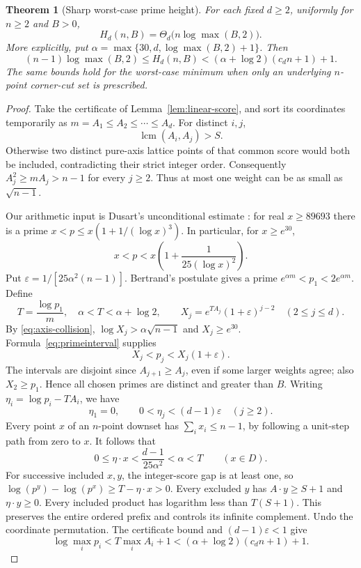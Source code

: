 \documentclass[11pt,a4paper]{article}
\newtheorem{theorem}{Theorem}
\theoremstyle{remark}
\begin{document}
\begin{theorem}[Sharp worst-case prime height]\label{thm:height}
For each fixed \(d\geq2\), uniformly for \(n\geq2\) and \(B>0\),
\[
 H_d(n,B)=\Theta_d\bigl(n\log\max(B,2)\bigr).
\]
More explicitly, put \(\alpha=\max\{30,d,\log\max(B,2)+1\}\).
Then
\[
 (n-1)\log\max(B,2)\leq H_d(n,B)
 <(\alpha+\log2)(c_dn+1)+1.                 \tag{16}\label{eq:primeheight}
\]
The same bounds hold for the worst-case minimum when only an underlying
\(n\)-point corner-cut set is prescribed.
\end{theorem}
\begin{proof}
Take the certificate of Lemma~\ref{lem:linear-score}, and sort its
coordinates temporarily as \(m=A_1\leq A_2\leq\cdots\leq A_d\).
For distinct \(i,j\),
\[
 \operatorname{lcm}(A_i,A_j)>S.              \tag{17}\label{eq:axis-collision}
\]
Otherwise two distinct pure-axis lattice points of that common score
would both be included, contradicting their strict integer order.
Consequently \(A_j^2\geq mA_j>n-1\) for every \(j\geq2\).
Thus at most one weight can be as small as \(\sqrt{n-1}\).

Our arithmetic input is Dusart's unconditional estimate
\cite[Proposition 5.4]{Dusart}: for real \(x\geq89693\) there is a
prime \(x<p\leq x(1+1/(\log x)^3)\).
In particular, for \(x\geq e^{30}\),
\[
 x<p<x\left(1+\frac{1}{25(\log x)^2}\right).
                                                        \tag{18}\label{eq:primeinterval}
\]
Put \(\varepsilon=1/[25\alpha^2(n-1)]\).
Bertrand's postulate \cite{Erdos} gives a prime
\(e^{\alpha m}<p_1<2e^{\alpha m}\). Define
\[
 T=\frac{\log p_1}{m},\quad \alpha<T<\alpha+\log2,
 \qquad X_j=e^{TA_j}(1+\varepsilon)^{j-2}\quad(2\leq j\leq d).
\]
By \eqref{eq:axis-collision}, \(\log X_j>\alpha\sqrt{n-1}\)
and \(X_j\geq e^{30}\). Formula~\eqref{eq:primeinterval} supplies
\[
 X_j<p_j<X_j(1+\varepsilon).
\]
The intervals are disjoint since \(A_{j+1}\geq A_j\), even if some
larger weights agree; also \(X_2\geq p_1\).
Hence all chosen primes are distinct and greater than \(B\).
Writing \(\eta_i=\log p_i-TA_i\), we have
\[
 \eta_1=0,\qquad 0<\eta_j<(d-1)\varepsilon\quad(j\geq2).
\]
Every point \(x\) of an \(n\)-point downset has
\(\sum_i x_i\leq n-1\), by following a unit-step path from zero to
\(x\). It follows that
\[
 0\leq\eta\cdot x<\frac{d-1}{25\alpha^2}<\alpha<T
 \qquad(x\in D).                            \tag{19}\label{eq:height-error}
\]
For successive included \(x,y\), the integer-score gap is at least
one, so
\(\log(p^y)-\log(p^x)\geq T-\eta\cdot x>0\).
Every excluded \(y\) has \(A\cdot y\geq S+1\) and
\(\eta\cdot y\geq0\). Every included product has logarithm
less than \(T(S+1)\). This preserves the entire ordered prefix and
controls its infinite complement. Undo the coordinate permutation.
The certificate bound and \((d-1)\varepsilon<1\) give
\[
 \log\max_i p_i<T\max_iA_i+1
 <(\alpha+\log2)(c_dn+1)+1.
\]


\end{proof}
\end{document}
